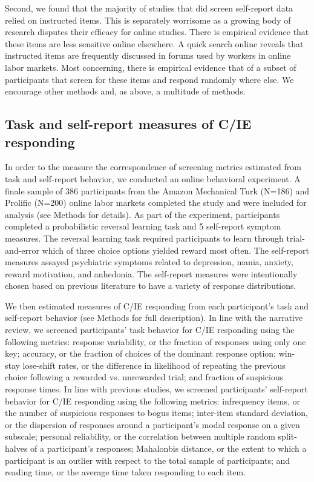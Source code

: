 \documentclass[a4paper,notitlepage,12pt]{article}
\begin{document}
Second, we found that the majority of studies that did screen self-report data relied on instructed items. This is separately worrisome as a growing body of research disputes their efficacy for online studies. There is empirical evidence that these items are less sensitive online elsewhere. A quick search online reveals that instructed items are frequently discussed in forums used by workers in online labor markets. Most concerning, there is empirical evidence that of a subset of participants that screen for these items and respond randomly where else. We encourage other methods and, as above, a multitude of methods. 

\subsection{Task and self-report measures of C/IE responding}

In order to the measure the correspondence of screening metrics estimated from task and self-report behavior, we conducted an online behavioral experiment. A finale sample of 386 participants from the Amazon Mechanical Turk (N=186) and Prolific (N=200) online labor markets completed the study and were included for analysis (see Methods for details). As part of the experiment, participants completed a probabilistic reversal learning task and 5 self-report symptom measures. The reversal learning task required participants to learn through trial-and-error which of three choice options yielded reward most often. The self-report measures assayed psychiatric symptoms related to depression, mania, anxiety, reward motivation, and anhedonia. The self-report measures were intentionally chosen based on previous literature to have a variety of response distributions. 

We then estimated measures of C/IE responding from each participant's task and self-report behavior (see Methods for full description). In line with the narrative review, we screened participants' task behavior for C/IE responding using the following metrics: response variability, or the fraction of responses using only one key; accuracy, or the fraction of choices of the dominant response option; win-stay lose-shift rates, or the difference in likelihood of repeating the previous choice following a rewarded vs. unrewarded trial; and fraction of suspicious response times. In line with previous studies, we screened participants' self-report behavior for C/IE responding using the following metrics: infrequency items, or the number of suspicious responses to bogus items; inter-item standard deviation, or the dispersion of responses around a participant's modal response on a given subscale; personal reliability, or the correlation between multiple random split-halves of a participant's responses; Mahalonbis distance, or the extent to which a participant is an outlier with respect to the total sample of participants; and reading time, or the average time taken responding to each item. 
\end{document}
